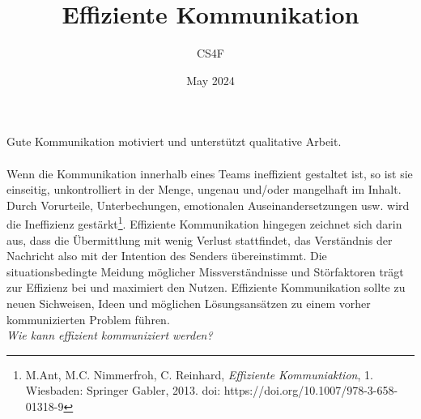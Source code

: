 \documentclass{article}
\title{Effiziente Kommunikation}
\author{CS4F}
\date{May 2024}
\begin{document}
\maketitle

Gute Kommunikation motiviert und unterstützt qualitative Arbeit.\\\\Wenn die Kommunikation innerhalb eines Teams ineffizient gestaltet ist, so ist sie einseitig, unkontrolliert in der Menge,  ungenau und/oder mangelhaft im Inhalt. Durch Vorurteile, Unterbechungen, emotionalen Auseinandersetzungen usw. wird die Ineffizienz gestärkt\footnote{M.Ant, M.C. Nimmerfroh, C. Reinhard, \textit{Effiziente Kommuniaktion}, 1. Wiesbaden: Springer Gabler, 2013. doi: https://doi.org/10.1007/978-3-658-01318-9}. Effiziente Kommunikation hingegen zeichnet sich darin aus, dass die Übermittlung mit wenig Verlust stattfindet, das Verständnis der Nachricht also mit der Intention des Senders übereinstimmt. Die situationsbedingte Meidung möglicher Missverständnisse und Störfaktoren trägt zur Effizienz bei und maximiert den Nutzen. Effiziente Kommunikation sollte zu neuen Sichweisen, Ideen und möglichen Lösungsansätzen zu einem vorher kommunizierten Problem führen.\\

\textit{Wie kann effizient kommuniziert werden?}\\
\end{document}
